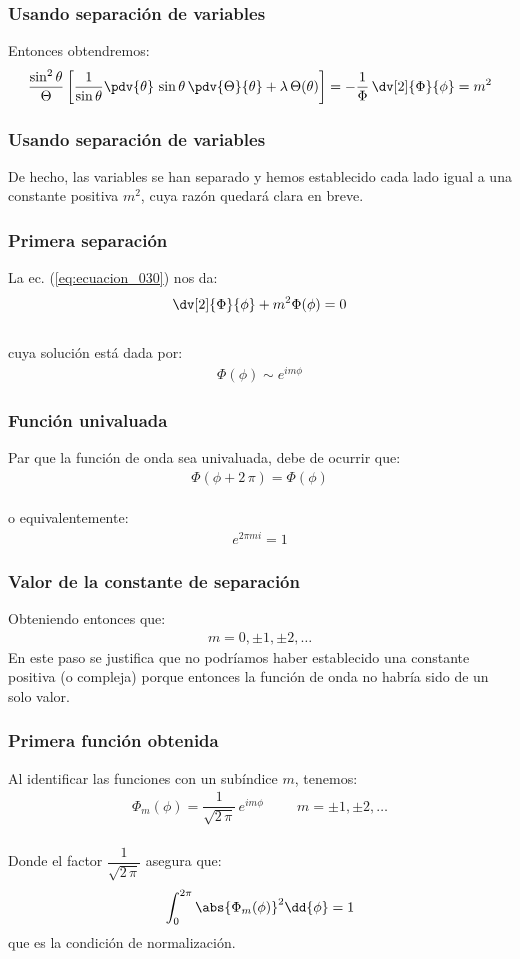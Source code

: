 \begin{frame}
\frametitle{Usando separación de variables}
Entonces obtendremos:
{\fontsize{12}{12}\selectfont
\begin{align}
\dfrac{\sin^{2} \theta}{\Theta} \left[ \dfrac{1}{\sin \theta} \pdv{\theta} \, \sin \theta \, \pdv{\Theta}{\theta} + \lambda \, \Theta (\theta) \right] = -  \dfrac{1}{\Phi} \, \dv[2]{\Phi}{\phi} = m^{2}
\label{eq:ecuacion_030}
\end{align}}
\end{frame}
\begin{frame}
\frametitle{Usando separación de variables}
De hecho, las variables se han separado y hemos establecido cada lado igual a una constante positiva $m^{2}$, cuya razón quedará clara en breve.
\end{frame}
\begin{frame}
\frametitle{Primera separación}
La ec. (\ref{eq:ecuacion_030}) nos da:
\begin{align*}
\dv[2]{\Phi}{\phi} + m^{2} \Phi (\phi) = 0
\end{align*}
\\
\bigskip
\pause
cuya solución está dada por:
\begin{align*}
\Phi(\phi) \sim e^{i m \phi}
\end{align*}
\end{frame}
\begin{frame}
\frametitle{Función univaluada}
Par que la función de onda sea univaluada, debe de ocurrir que:
\begin{align}
 \Phi(\phi +  2 \, \pi) = \Phi(\phi)
 \label{eq:ecuacion_031}
\end{align}
\\
\bigskip
\pause
o equivalentemente:
\begin{align*}
e^{2 \pi m i} = 1
\end{align*}
\end{frame}
\begin{frame}
\frametitle{Valor de la constante de separación}
Obteniendo entonces que:
\begin{align*}
m = 0, \pm 1, \pm 2, \ldots
\end{align*}
\pause
En este paso se justifica que no podríamos haber establecido una constante positiva (o compleja) porque entonces la función de onda no habría sido de un solo valor.
\end{frame}
\begin{frame}
\frametitle{Primera función obtenida}
Al identificar las funciones con un subíndice $m$, tenemos:
\begin{align}
\Phi_{m}(\phi) = \dfrac{1}{\sqrt{2 \, \pi}} \, e^{i m \phi} \hspace{1cm} m = \pm 1, \pm 2, \ldots
\label{eq:ecuacion_032}
\end{align}
\\
\bigskip
\pause
Donde el factor $\dfrac{1}{\sqrt{2 \, \pi}}$ asegura que:
\begin{align*}
\int_{0}^{2 \pi} \abs{\Phi_{m}(\phi)}^{2} \dd{\phi} = 1
\end{align*}
que es la condición de normalización.
\end{frame}
